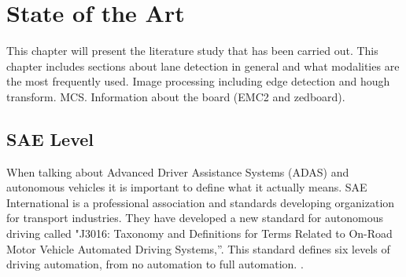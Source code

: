 \chapter{State of the Art}
This chapter will present the literature study that has been carried out. This chapter includes sections about
lane detection in general and what modalities are the most frequently used. Image processing including edge detection and hough transform. MCS. Information about the board  (EMC2 and zedboard).

\section{SAE Level}
When talking about Advanced Driver Assistance Systems (ADAS) and autonomous vehicles it is important to define what it actually means. SAE International is a professional association and standards developing organization for transport industries. They have developed a new standard for autonomous driving called  "J3016: Taxonomy and Definitions for Terms Related to On-Road Motor Vehicle Automated Driving Systems,”. This standard defines six levels of driving automation, from no automation to full automation. \cite{SAE} \cite{SAEweb}. 




